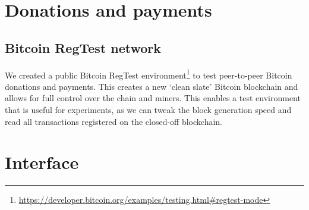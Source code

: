 \section{Donations and payments}
\subsection{Bitcoin RegTest network}
We created a public Bitcoin RegTest environment\footnote{\url{https://developer.bitcoin.org/examples/testing.html\#regtest-mode}} to test peer-to-peer Bitcoin donations and payments. This creates a new `clean slate' Bitcoin blockchain and allows for full control over the chain and miners. This enables a test environment that is useful for experiments, as we can tweak the block generation speed and read all transactions registered on the closed-off blockchain.
\label{sec:regtest-network-impl}
\section{Interface}
